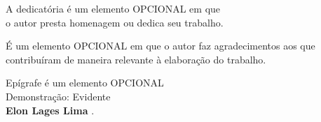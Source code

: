 \documentclass[tcc]{wstex}
\begin{document}


\begin{dedicatoria}

	A dedicatória é um elemento OPCIONAL em que \\ o autor presta homenagem ou dedica seu trabalho.

\end{dedicatoria}

\begin{agradecimentos}

	É um elemento OPCIONAL em que o autor faz agradecimentos aos que contribuíram de
	maneira relevante à elaboração do trabalho.

\end{agradecimentos}

\begin{epigrafe}

	Epígrafe é um elemento OPCIONAL \\
	Demonstração: Evidente \\
	\textbf{Elon Lages Lima} \cite[p. 154]{elon}.

\end{epigrafe}

\end{document}
